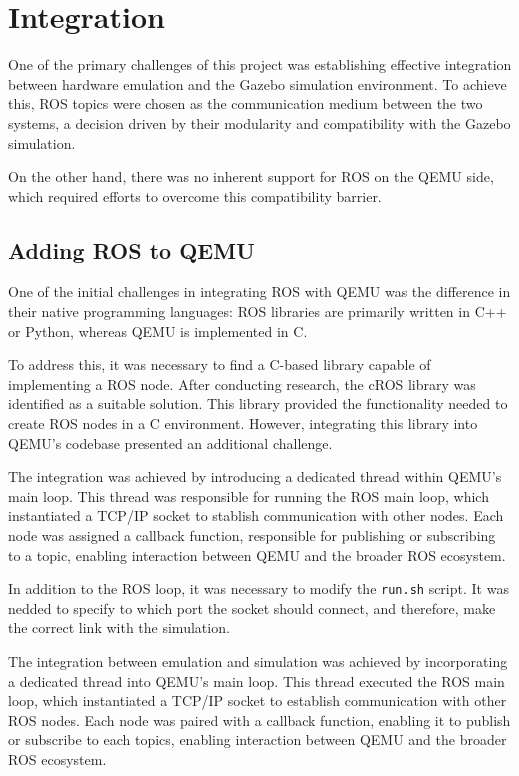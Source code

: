 \documentclass[../../monografia.tex]{subfiles}
\begin{document}
\section{Integration}

One of the primary challenges of this project was establishing effective integration between hardware emulation and the Gazebo simulation environment. To achieve this, ROS topics were chosen as the communication medium between the two systems, a decision driven by their modularity and compatibility with the Gazebo simulation.

On the other hand, there was no inherent support for ROS on the QEMU side, which required efforts to overcome this compatibility barrier.

\subsection{Adding ROS to QEMU}

One of the initial challenges in integrating ROS with QEMU was the difference in their native programming languages: ROS libraries are primarily written in C++ or Python, whereas QEMU is implemented in C.

To address this, it was necessary to find a C-based library capable of implementing a ROS node. After conducting research, the cROS library \cite{CROS_23} was identified as a suitable solution. This library provided the functionality needed to create ROS nodes in a C environment. However, integrating this library into QEMU's codebase presented an additional challenge.


The integration was achieved by introducing a dedicated thread within QEMU's main loop. This thread was responsible for running the ROS main loop, which instantiated a TCP/IP socket to stablish communication with other nodes. Each node was assigned a callback function, responsible for publishing or subscribing to a topic, enabling interaction between QEMU and the broader ROS ecosystem.

In addition to the ROS loop, it was necessary to modify the \texttt{run.sh} script. It was nedded to specify to which port the socket should connect, and therefore, make the correct link with the simulation.

The integration between emulation and simulation was achieved by incorporating a dedicated thread into QEMU's main loop. This thread executed the ROS main loop, which instantiated a TCP/IP socket to establish communication with other ROS nodes. Each node was paired with a callback function, enabling it to publish or subscribe to each topics, enabling interaction between QEMU and the broader ROS ecosystem.
\end{document}
